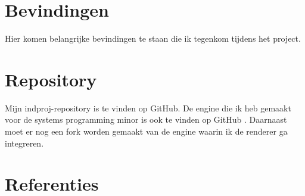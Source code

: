 \documentclass{article}
\begin{document}
\section{Bevindingen}
Hier komen belangrijke bevindingen te staan die ik tegenkom tijdens het project.


\section{Repository}
Mijn indproj-repository \cite{my_repo} is te vinden op GitHub.
De engine die ik heb gemaakt voor de systems programming minor is ook te vinden op GitHub \cite{engine_bravo}.
Daarnaast moet er nog een fork worden gemaakt van de engine waarin ik de renderer ga integreren.

\newpage

\section{Referenties}
\printbibliography
\end{document}
